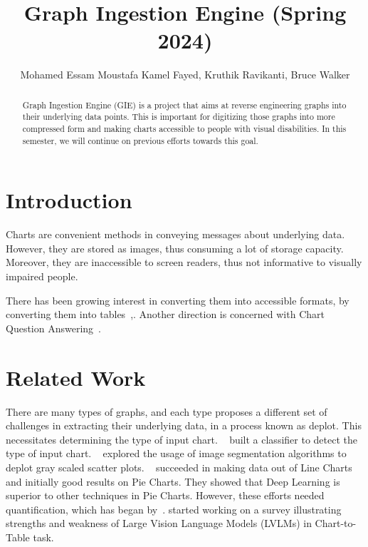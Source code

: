 \documentclass[
	letterpaper, %
]{jdf}
\author{Mohamed Essam Moustafa Kamel Fayed, Kruthik Ravikanti, Bruce Walker}
\title{Graph Ingestion Engine (Spring 2024)}
\begin{document}

\maketitle

\begin{abstract}

    Graph Ingestion Engine (GIE) is a project that aims at reverse engineering graphs into their underlying data points.
    This is important for digitizing those graphs into more compressed form and making charts accessible to people with visual disabilities.
    In this semester, we will continue on previous efforts towards this goal.
\end{abstract}

\section{Introduction}\label{sect:introduction}

Charts are convenient methods in conveying messages about underlying data.
However, they are stored as images, thus consuming a lot of storage capacity.
Moreover, they are inaccessible to screen readers, thus not informative to visually impaired people.

There has been growing interest in converting them into accessible formats, by converting them into tables~\cite{liu2022deplot},. 
Another direction is concerned with Chart Question Answering~\cite{masry2022chartqa,masry2024chartgemma}.


\section{Related Work}
\label{sect:related}
There are many types of graphs, and each type proposes a different set of challenges in extracting their underlying data, in a process known as deplot.
This necessitates determining the type of input chart.
~\cite{dsouza2023} built a classifier to detect the type of input chart.
~\cite{dsouza2022} explored the usage of image segmentation algorithms to deplot gray scaled scatter plots.
~\cite{dsouza2023} succeeded in making data out of Line Charts and initially good results on Pie Charts.
They showed that Deep Learning is superior to other techniques in Pie Charts.
However, these efforts needed quantification, which has began by~\cite{fayed2024}.
\cite{fayed2024} started working on a survey illustrating strengths and weakness of Large Vision Language Models (LVLMs) in Chart-to-Table task.
\end{document}
